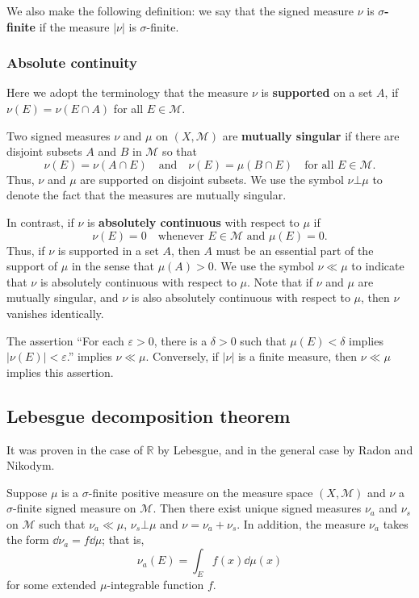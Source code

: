 We also make the following definition: we say that the signed measure $\nu$ is \textbf{$\sigma$-finite} if the measure $|\nu|$ is $\sigma$-finite.

\subsubsection{Absolute continuity}

Here we adopt the terminology that the measure $\nu$ is \textbf{supported} on a set $A$,
if $\nu(E) = \nu(E\cap A)$ for all $E\in\mathcal M$.

Two signed measures $\nu$ and $\mu$ on $(X,\mathcal M)$ are \textbf{mutually singular} if there are disjoint subsets $A$ and $B$ in $\mathcal M$ so that 
\[
\nu(E) = \nu(A\cap E)
\quad\text{and}\quad
\nu(E)=\mu(B\cap E)
\quad\text{for all } 
E\in\mathcal M.
\]
Thus, $\nu$ and $\mu$ are supported on disjoint subsets.
We use the symbol $\nu\bot \mu$ to denote the fact that the measures are mutually singular.

In contrast, if $\nu$ is \textbf{absolutely continuous} with respect to $\mu$ if 
\[
\nu(E) = 0\quad \text{whenever }E\in\mathcal M \text{ and }\mu(E) = 0.
\]
Thus, if $\nu$ is supported in a set $A$, then $A$ must be an essential part of the support of $\mu$ in the sense that $\mu(A)>0$.
We use the symbol $\nu\ll \mu$ to indicate that $\nu$ is absolutely continuous with respect to $\mu$.
Note that if $\nu$ and $\mu$ are mutually singular, and $\nu$ is also absolutely continuous with respect to $\mu$, then $\nu$ vanishes identically.

\begin{proposition}
  The assertion 
  ``For each $\varepsilon>0$, there is a $\delta>0$ such that $\mu(E)<\delta$ implies $|\nu(E)|<\varepsilon$.''
  implies $\nu\ll\mu$.
  Conversely, if $|\nu|$ is a finite measure, then $\nu\ll\mu$ implies this assertion.
\end{proposition}


\subsection{Lebesgue decomposition theorem}

It was proven in the case of $\mathbb R$ by Lebesgue, and in the general case by Radon and Nikodym.

\begin{theorem}
  Suppose $\mu$ is a $\sigma$-finite positive measure on the measure space $(X,\mathcal M)$ and 
  $\nu$ a $\sigma$-finite signed measure on $\mathcal M$.
  Then there exist unique signed measures $\nu_a$ and $\nu_s$ on $\mathcal M$ such that 
  $\nu_a\ll\mu$, $\nu_s\bot\mu$ and $\nu=\nu_a+\nu_s$.
  In addition, the measure $\nu_a$ takes the form $\dd\nu_a=f\dd\mu$; that is,
  \[
  \nu_a(E) = \int_Ef(x)\dd\mu(x)
  \]
  for some extended $\mu$-integrable function $f$.
\end{theorem}

